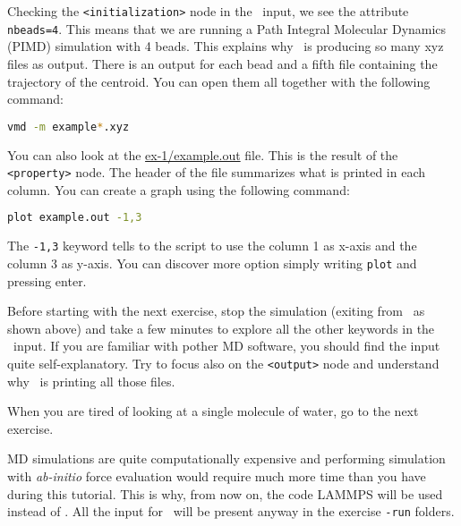 \documentclass{article}
\begin{document}
\begin{Exercise}[label={i-pi},title={PIMD: a client/server approach}]
\Question
Checking the \texttt{<initialization>} node in the \ipi\ input, we see
the attribute \texttt{nbeads=4}. This means that we are running a Path
Integral Molecular Dynamics (PIMD) simulation with 4 beads.
This explains why \ipi\ is producing so many xyz files as output. There
is an output for each bead and a fifth file containing the trajectory
of the centroid. You can open them all together with the following
command:
\begin{lstlisting}[language=bash]
vmd -m example*.xyz
\end{lstlisting}
You can also look at the \url{ex-1/example.out} file. This is the
result of the \texttt{<property>} node. The header of the file
summarizes what is printed in each column. You can create a graph using
the following command:
\begin{lstlisting}[language=bash]
plot example.out -1,3
\end{lstlisting}
The \texttt{-1,3} keyword tells to the script to use the column 1 as
x-axis and the column 3 as y-axis. You can discover more option simply
writing \texttt{plot} and pressing enter.
\end{Exercise}
\vspace{1em}

Before starting with the next exercise, stop the simulation (exiting
from \ipi\ as shown above) and  take a few minutes to explore
all the other keywords in the \ipi\ input. If you are familiar with
pother MD software, you should find the input quite self-explanatory.
Try to focus also on the \texttt{<output>} node and understand why
\ipi\ is printing all those files.


When you are tired of looking at a single molecule of water, go to the
next exercise.

MD simulations are quite computationally expensive and performing
simulation with \emph{ab-initio} force evaluation would require much
more time than you have during this tutorial. This is why,
from now on, the code LAMMPS will be used instead of \qe. All the
input for \qe\ will be present anyway in the exercise \texttt{-run} folders.

\vspace{2em}
\end{document}
